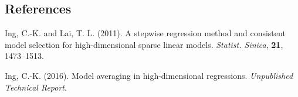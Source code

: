 \documentclass[12pt]{article}
\begin{document}
%        
%
%        

\subsection*{References}

\begin{description}

\item
Ing, C.-K. and Lai, T. L. (2011). A stepwise regression method and consistent model selection
for high-dimensional sparse linear models. \textit{Statist. Sinica}, \textbf{21}, 1473--1513.
\item
Ing, C.-K. (2016). Model averaging in high-dimensional regressions. \textit{Unpublished Technical Report}.

\end{description}
\end{document}
